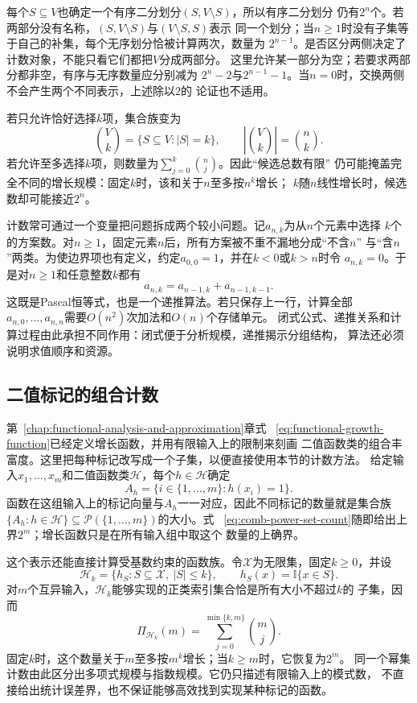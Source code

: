 每个$S\subseteq V$也确定一个有序二分划分$(S,V\setminus S)$，所以有序二分划分
仍有$2^n$个。若两部分没有名称，$(S,V\setminus S)$与$(V\setminus S,S)$表示
同一个划分；当$n\geq1$时没有子集等于自己的补集，每个无序划分恰被计算两次，数量为
$2^{n-1}$。是否区分两侧决定了计数对象，不能只看它们都把$V$分成两部分。
这里允许某一部分为空；若要求两部分都非空，有序与无序数量应分别减为
$2^n-2$与$2^{n-1}-1$。当$n=0$时，交换两侧不会产生两个不同表示，上述除以$2$的
论证也不适用。

若只允许恰好选择$k$项，集合族变为
\[
  \binom{V}{k}=\{S\subseteq V:|S|=k\},
  \qquad
  \left|\binom{V}{k}\right|=\binom{n}{k}.
\]
若允许至多选择$k$项，则数量为$\sum_{j=0}^{k}\binom{n}{j}$。因此“候选总数有限”
仍可能掩盖完全不同的增长规模：固定$k$时，该和关于$n$至多按$n^k$增长；
$k$随$n$线性增长时，候选数却可能接近$2^n$。

计数常可通过一个变量把问题拆成两个较小问题。记$a_{n,k}$为从$n$个元素中选择
$k$个的方案数。对$n\geq1$，固定元素$n$后，所有方案被不重不漏地分成“不含$n$”
与“含$n$”两类。为使边界项也有定义，约定$a_{0,0}=1$，并在$k<0$或$k>n$时令
$a_{n,k}=0$。于是对$n\geq1$和任意整数$k$都有
\begin{equation}
  a_{n,k}=a_{n-1,k}+a_{n-1,k-1}.
  \label{eq:comb-binomial-recurrence}
\end{equation}
这既是Pascal恒等式，也是一个递推算法。若只保存上一行，计算全部
$a_{n,0},\ldots,a_{n,n}$需要$O(n^2)$次加法和$O(n)$个存储单元。
闭式公式、递推关系和计算过程由此承担不同作用：闭式便于分析规模，递推揭示分组结构，
算法还必须说明求值顺序和资源。

\subsection{二值标记的组合计数}

第~\ref{chap:functional-analysis-and-approximation}章式~
\eqref{eq:functional-growth-function}已经定义增长函数，并用有限输入上的限制来刻画
二值函数类的组合丰富度。这里把每种标记改写成一个子集，以便直接使用本节的计数方法。
给定输入$x_1,\ldots,x_m$和二值函数类$\mathcal{H}$，每个$h\in\mathcal{H}$确定
\[
  A_h=\{i\in\{1,\ldots,m\}:h(x_i)=1\}.
\]
函数在这组输入上的标记向量与$A_h$一一对应，因此不同标记的数量就是集合族
$\{A_h:h\in\mathcal{H}\}\subseteq\mathcal{P}(\{1,\ldots,m\})$的大小。式~
\eqref{eq:comb-power-set-count}随即给出上界$2^m$；增长函数只是在所有输入组中取这个
数量的上确界。

这个表示还能直接计算受基数约束的函数族。令$\mathcal{X}$为无限集，固定$k\geq0$，并设
\[
  \mathcal{H}_k
  =
  \{h_S:S\subseteq\mathcal{X},\ |S|\leq k\},
  \qquad
  h_S(x)=\mathbb{I}\{x\in S\}.
\]
对$m$个互异输入，$\mathcal{H}_k$能够实现的正类索引集合恰是所有大小不超过$k$的
子集，因而
\[
  \Pi_{\mathcal{H}_k}(m)
  =
  \sum_{j=0}^{\min\{k,m\}}\binom{m}{j}.
\]
固定$k$时，这个数量关于$m$至多按$m^k$增长；当$k\geq m$时，它恢复为$2^m$。
同一个幂集计数由此区分出多项式规模与指数规模。它仍只描述有限输入上的模式数，
不直接给出统计误差界，也不保证能够高效找到实现某种标记的函数。

